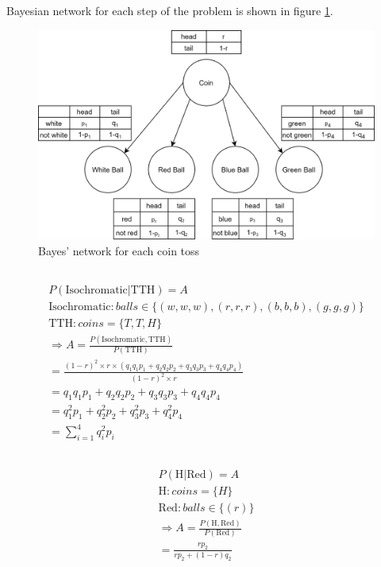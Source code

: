 \documentclass[en]{university}
\begin{document}
\setupdocument

\section{}
\subsection{}
Bayesian network for each step of the problem is shown in figure \ref{fig:bayes-net}.
\begin{figure}[htbp]
    \centering
    \includegraphics[width=\textwidth]{./assets/4-1.drawio.png}
    \caption{Bayes' network for each coin toss}
    \label{fig:bayes-net}
\end{figure}

\subsection{}
\begin{gather*}
    P(\text{Isochromatic}|\text{TTH}) = A \\
    \text{Isochromatic}: balls \in \{(w, w, w), (r, r, r), (b, b, b), (g, g, g)\} \\
    \text{TTH}: coins = \{T,T,H\} \\
    \Rightarrow A = \frac{P(\text{Isochromatic}, \text{TTH})}{P(\text{TTH})} \\
    = \frac{(1-r)^2 \times r \times (q_1 q_1 p_1 + q_2 q_2 p_2 + q_3 q_3 p_3 + q_4 q_4 p_4)}{(1-r)^2 \times r} \\
    = q_1 q_1 p_1 + q_2 q_2 p_2 + q_3 q_3 p_3 + q_4 q_4 p_4 \\
    = q_1^2 p_1 + q_2^2 p_2 + q_3^2 p_3 + q_4^2 p_4 \\
    = \sum_{i=1}^4 q_i^2 p_i 
\end{gather*}

\subsection{}
\begin{gather*}
    P(\text{H}|\text{Red}) = A \\
    \text{H}: coins = \{H\} \\
    \text{Red}: balls \in \{(r)\} \\
    \Rightarrow A = \frac{P(\text{H}, \text{Red})}{P(\text{Red})} \\
    = \frac{r p_2}{rp_2 + (1-r)q_2} 
\end{gather*}
\end{document}
